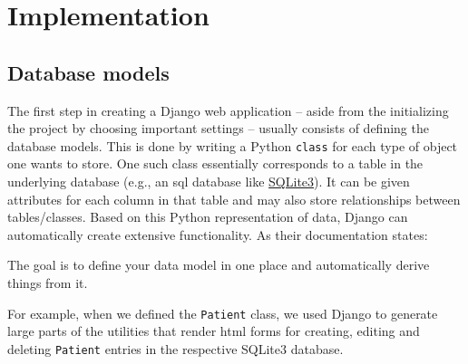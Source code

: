 \documentclass[\relativeRoot/main.tex]{subfiles}
\begin{document}
\section{Implementation}
\label{sec:lyprox:implementation}

\subsection*{Database models}
\label{subsec:lyprox:implementation:models}

The first step in creating a Django web application -- aside from the initializing the project by choosing important settings -- usually consists of defining the database models. This is done by writing a Python \texttt{class} for each type of object one wants to store. One such class essentially corresponds to a table in the underlying database (e.g., an \acrshort{sql} database like \href{https://www.sqlite.org/index.html}{SQLite3}). It can be given attributes for each column in that table and may also store relationships between tables/classes. Based on this Python representation of data, Django can automatically create extensive functionality. As their documentation states: 

\begin{displayquote}
    The goal is to define your data model in one place and automatically derive things from it.
\end{displayquote}

For example, when we defined the \texttt{Patient} class, we used Django to generate large parts of the utilities that render \acrshort{html} forms for creating, editing and deleting \texttt{Patient} entries in the respective SQLite3 database.
\end{document}
